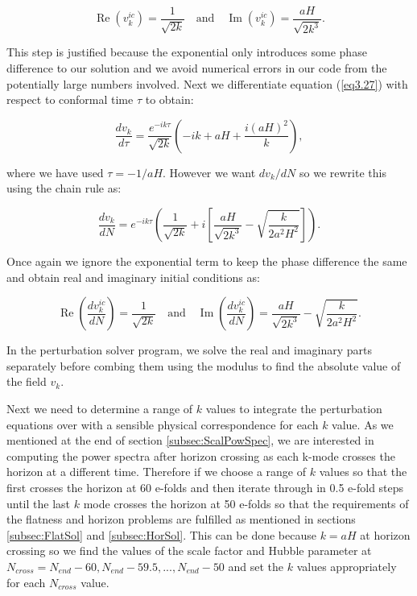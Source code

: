 \documentclass[a4paper,12pt,twoside]{report}
\begin{document}
\begin{equation} \label{eq3.28}
\operatorname{Re}(v_{k}^{ic}) = \frac{1}{\sqrt{2k}} \quad \mathrm{and} \quad \operatorname{Im}(v_{k}^{ic}) = \frac{aH}{\sqrt{2k^{3}}}.
\end{equation}

This step is justified because the exponential only introduces some phase difference to our solution and we avoid numerical errors in our code from the potentially large numbers involved. Next we differentiate equation (\ref{eq3.27}) with respect to conformal time $\tau$ to obtain:

\begin{equation} \label{eq3.29}
\frac{dv_{k}}{d\tau} = \frac{e^{-ik\tau}}{\sqrt{2k}}\left( -ik + aH + \frac{i(aH)^{2}}{k} \right),
\end{equation}

where we have used $\tau = -1/aH$. However we want $dv_{k}/dN$ so we rewrite this using the chain rule as:

\begin{equation} \label{eq3.30}
\frac{dv_{k}}{dN} = e^{-ik\tau}\left(\frac{1}{\sqrt{2k}} + i \left[ \frac{aH}{\sqrt{2k^{3}}} - \sqrt{\frac{k}{2a^{2}H^{2}}} \right] \right).
\end{equation}

Once again we ignore the exponential term to keep the phase difference the same and obtain real and imaginary initial conditions as:

\begin{equation} \label{eq3.31}
\operatorname{Re}\left(\frac{dv_{k}^{ic}}{dN}\right) = \frac{1}{\sqrt{2k}} \quad \mathrm{and} \quad \operatorname{Im}\left(\frac{dv_{k}^{ic}}{dN}\right) = \frac{aH}{\sqrt{2k^{3}}} - \sqrt{\frac{k}{2a^{2}H^{2}}}.
\end{equation}

In the perturbation solver program, we solve the real and imaginary parts separately before combing them using the modulus to find the absolute value of the field $v_{k}$.

Next we need to determine a range of $k$ values to integrate the perturbation equations over with a sensible physical correspondence for each $k$ value. As we mentioned at the end of section \ref{subsec:ScalPowSpec}, we are interested in computing the power spectra after horizon crossing as each k-mode crosses the horizon at a different time. Therefore if we choose a range of $k$ values so that the first crosses the horizon at 60 e-folds and then iterate through in 0.5 e-fold steps until the last $k$ mode crosses the horizon at 50 e-folds so that the requirements of the flatness and horizon problems are fulfilled as mentioned in sections \ref{subsec:FlatSol} and \ref{subsec:HorSol}. This can be done because $k = aH$ at horizon crossing so we find the values of the scale factor and Hubble parameter at $N_{cross} = N_{end} - 60, N_{end} - 59.5, ..., N_{end} - 50$ and set the $k$ values appropriately for each $N_{cross}$ value.
\end{document}
